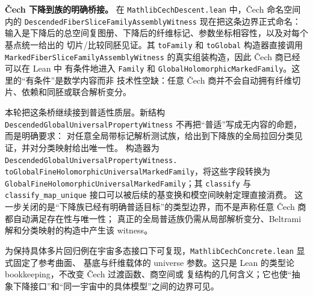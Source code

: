 \documentclass[UTF8,fontset=none,a4paper,11pt]{ctexart}
\begin{document}
\textbf{Čech 下降到族的明确桥接。}
在 \texttt{MathlibCechDescent.lean} 中，Čech 命名空间内的
\texttt{DescendedFiberSliceFamilyAssembly}\allowbreak\texttt{Witness} 现在把这条边界正式命名：
输入是下降后的总空间复图册、下降后的纤维标记、参数坐标相容性，以及对每个基点统一给出的
切片/比较同胚见证。其 \texttt{toFamily} 和 \texttt{toGlobal} 构造器直接调用
\texttt{MarkedFiberSliceFamilyAssemblyWitness} 的真实组装构造，因此 Čech 商已经可以在 Lean 中
有条件地进入 \texttt{Family} 和
\texttt{GlobalHolomorphic}\allowbreak\texttt{Marked}\allowbreak\texttt{Family}。这里的“有条件”是数学内容而非
技术性空缺：任意 Čech 商并不会自动拥有纤维切片、依赖和同胚或联合解析变分。

本轮把这条桥继续接到普适性质层。新结构
\texttt{DescendedGlobalUniversalProperty}\allowbreak\texttt{Witness} 不再把“普适”写成无内容的命题，而是明确要求：
对任意全局带标记解析测试族，给出到下降族的全局拉回分类见证，并对分类映射给出唯一性。
构造器为\linebreak
\texttt{DescendedGlobalUniversalProperty}\allowbreak\texttt{Witness.}\linebreak
\texttt{toGlobalFineHolomorphicUniversal}\linebreak[4]
\texttt{MarkedFamily}，将这些字段转换为
\texttt{GlobalFineHolomorphicUniversal}\linebreak[4]
\texttt{MarkedFamily}；其
\texttt{classify} 与 \texttt{classify\_map\_unique} 接口可以被后续的基变换和模空间映射定理直接消费。
这一步关闭的是“下降族已经有明确普适目标”的类型边界，而不是声称任意 Čech 商都自动满足存在性与唯一性；
真正的全局普适族仍需从局部解析变分、Beltrami 解和分类映射的构造中产生该 witness。

为保持具体多片回归例在宇宙多态接口下可复现，\texttt{MathlibCechConcrete.lean} 显式固定了参考曲面、
基底与纤维载体的 universe 参数。这只是 Lean 的类型论 bookkeeping，不改变 Čech 过渡函数、商空间或
复结构的几何含义；它也使“抽象下降接口”和“同一宇宙中的具体模型”之间的边界可见。
\end{document}

